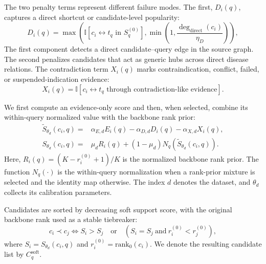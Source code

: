 \documentclass[pdflatex,sn-mathphys-num]{sn-jnl}
\begin{document}
The two penalty terms represent different failure modes. The first, $D_i(q)$, captures a direct shortcut or candidate-level popularity:
\begin{equation}
D_i(q)=
\max\left(
\mathbb{I}[c_i \leftrightarrow t_q \text{ in } S^{(0)}_q],
\min\left(1,\frac{\deg_{\mathrm{direct}}(c_i)}{\eta_D}\right)
\right),
\label{eq:shortcut_penalty}
\end{equation}
The first component detects a direct candidate--query edge in the source graph. The second penalizes candidates that act as generic hubs across direct disease relations. The contradiction term $X_i(q)$ marks contraindication, conflict, failed, or suspended-indication evidence:
\begin{equation}
X_i(q)=\mathbb{I}[c_i \leftrightarrow t_q \text{ through contradiction-like evidence}].
\label{eq:conflict_penalty}
\end{equation}

We first compute an evidence-only score and then, when selected, combine its within-query normalized value with the backbone rank prior:
\begin{equation}
\begin{aligned}
\widetilde{S}_{\theta_d}(c_i,q)=&
\alpha_{E,d}E_i(q)
-\alpha_{D,d}D_i(q)
-\alpha_{X,d}X_i(q),\\
S_{\theta_d}(c_i,q)=&
\mu_d R_i(q)+(1-\mu_d)N_q\!\left(\widetilde{S}_{\theta_d}(c_i,q)\right).
\end{aligned}
\label{eq:soft_general}
\end{equation}
Here, $R_i(q)=(K-r_i^{(0)}+1)/K$ is the normalized backbone rank prior. The function $N_q(\cdot)$ is the within-query normalization when a rank-prior mixture is selected and the identity map otherwise. The index $d$ denotes the dataset, and $\theta_d$ collects its calibration parameters.

Candidates are sorted by decreasing soft support score, with the original backbone rank used as a stable tiebreaker:
\begin{equation}
c_i \prec c_j
\Longleftrightarrow
S_i>S_j
\quad \mathrm{or}\quad
(S_i=S_j \ \mathrm{and}\ r^{(0)}_i<r^{(0)}_j),
\label{eq:tie_break}
\end{equation}
where $S_i=S_{\theta_d}(c_i,q)$ and $r^{(0)}_i=\mathrm{rank}_0(c_i)$. We denote the resulting candidate list by $C^{\mathrm{soft}}_q$.
\end{document}

